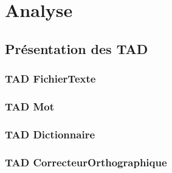 \section{Analyse}
	\subsection{Présentation des TAD}
		\subsubsection{TAD FichierTexte}
		
		\subsubsection{TAD Mot}
		
		\subsubsection{TAD Dictionnaire}
		
		\subsubsection{TAD CorrecteurOrthographique}
